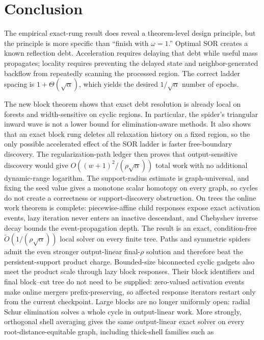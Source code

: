 \section{Conclusion}

The empirical exact-rung result does reveal a theorem-level design principle,
but the principle is more specific than ``finish with $\omega=1$.''  Optimal
SOR creates a known reflection debt.  Acceleration requires delaying that
debt while useful mass propagates; locality requires preventing the delayed
state and neighbor-generated backflow from repeatedly scanning the processed
region.  The correct ladder spacing is $1+\Theta(\sqrt\alpha)$, which yields
the desired $1/\sqrt\alpha$ number of epochs.

The new block theorem shows that exact debt resolution is already local on
forests and width-sensitive on cyclic regions.  In particular, the spider's
triangular inward wave is not a lower bound for elimination-aware methods.
It also shows that an exact block rung deletes all relaxation history on a
fixed region, so the only possible accelerated effect of the SOR ladder is
faster free-boundary discovery.
The regularization-path ledger then proves that output-sensitive discovery
would give $O((w+1)^2/(\rho\sqrt\alpha))$ total work with no additional
dynamic-range logarithm.  The support-radius estimate is graph-universal, and
fixing the seed value gives a monotone scalar homotopy on every graph, so
cycles do not create a correctness or support-discovery obstruction.  On
trees the online work theorem is complete:
piecewise-affine child responses expose exact activation events, lazy
iteration never enters an inactive descendant, and Chebyshev inverse decay
bounds the event-propagation depth.  The result is an exact, condition-free
$\widetilde O(1/(\rho\sqrt\alpha))$ local solver on every finite tree.  Paths
and symmetric spiders admit the even stronger output-linear final-$\rho$
solution and therefore beat the persistent-support product charge.
Bounded-size biconnected cyclic gadgets also meet the product scale through
lazy block responses.  Their block identifiers and final block--cut tree do
not need to be supplied: zero-valued activation events make online mergers
prefix-preserving, so affected response iterators restart only from the
current checkpoint.  Large blocks are no longer uniformly open: radial
Schur elimination solves a whole cycle in output-linear work.  More strongly,
orthogonal shell averaging gives the same output-linear exact solver on every
root-distance-equitable graph, including thick-shell families such as
